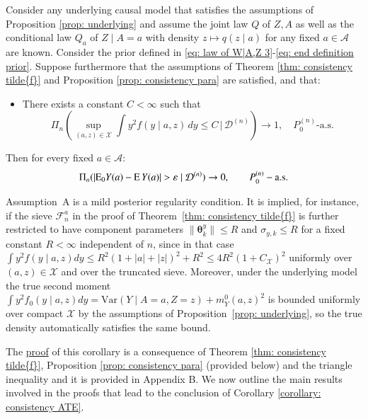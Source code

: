 \begin{corollary}\label{corollary: consistency ATE}
    Consider any underlying causal model that satisfies the assumptions of Proposition \ref{prop: underlying} and assume the joint law $Q$ of $Z,A$ as well as the conditional law $Q_a$ of $Z\mid A=a$ with density $z \mapsto q(z \mid a)$ for any fixed $a \in \mathcal{A}$ are known. Consider the prior defined in \eqref{eq: law of W|A,Z 3}-\eqref{eq: end definition prior}. Suppose furthermore that the assumptions of Theorem \ref{thm: consistency tilde{f}} and Proposition \ref{prop: consistency para} are satisfied, and that:
    \begin{itemize}
        \item[A.] There exists a constant $C < \infty$ such that
        \[
        \Pi_n\!\left(\sup_{(a,z)\in\mathcal{X}}\int y^2 f(y\mid a,z)\,dy \leq C \,\Big|\, \mathcal{D}^{(n)}\right) \to 1, \quad P^{(n)}_0\text{-a.s.}
        \]
    \end{itemize}
    Then for every fixed $a \in \mathcal{A}$:
    \begin{align}
        \Pi_n ( |\mathrm{E}_0 Y(a) - \mathrm{E} \, Y(a)| > \varepsilon \mid \mathcal{D}^{(n)}) \rightarrow 0, \quad \quad P^{(n)}_0-\text{a.s.}
    \end{align}
\end{corollary}
\begin{remark}
Assumption~A is a mild posterior regularity condition. It is implied, for instance, if the sieve $\mathcal{F}_n^a$ in the proof of Theorem~\ref{thm: consistency tilde{f}} is further restricted to have component parameters $\|\boldsymbol{\theta}_k^y\| \leq R$ and $\sigma_{y,k} \leq R$ for a fixed constant $R < \infty$ independent of $n$, since in that case $\int y^2 f(y\mid a,z)dy \leq R^2(1+|a|+|z|)^2 + R^2 \leq 4R^2(1+C_{\mathcal{X}})^2$ uniformly over $(a,z)\in\mathcal{X}$ and over the truncated sieve. Moreover, under the underlying model the true second moment $\int y^2 f_0(y\mid a,z)dy = \mathrm{Var}(Y\mid A=a,Z=z) + m_Y^0(a,z)^2$ is bounded uniformly over compact $\mathcal{X}$ by the assumptions of Proposition~\ref{prop: underlying}, so the true density automatically satisfies the same bound.
\end{remark}
The \hyperlink{proof of corollary}{proof} of this corollary is a consequence of Theorem \ref{thm: consistency tilde{f}}, Proposition \ref{prop: consistency para} (provided below) and the triangle inequality and it is provided in Appendix B. We now outline the main results involved in the proofs that lead to the conclusion of Corollary \ref{corollary: consistency ATE}. 

